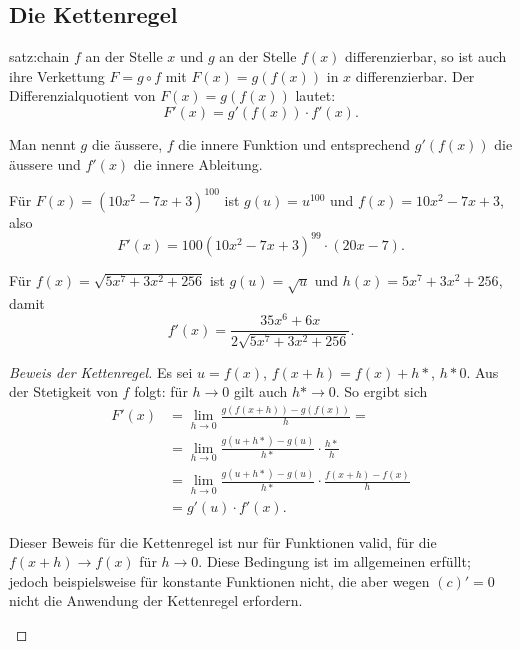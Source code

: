 \documentclass[%
11pt,%
twoside,%
titlepage,%
german,%
headsepline%
]{scrartcl}
\begin{document}
\subsection{Die Kettenregel}
\begin{csatz}{satz:chain}
$f$ an der Stelle $x$ und $g$ an der Stelle $f(x)$ differenzierbar, so ist auch ihre Verkettung $F=g\circ f$ mit $F(x)=g(f(x))$ in $x$ differenzierbar. Der Differenzialquotient von $F(x)=g(f(x))$ lautet:
$$F'(x)=g'(f(x))\cdot f'(x).$$
\end{csatz}
\begin{bem}
Man nennt $g$ die \"aussere, $f$ die innere Funktion und entsprechend $g'(f(x))$ die \"aussere und $f'(x)$ die innere Ableitung.
\end{bem}
\begin{bsps}
F\"ur $F(x)=(10x^2-7x+3)^{100}$ ist $g(u)=u^{100}$ und $f(x)=10x^2-7x+3$, also $$F'(x)=100(10x^2-7x+3)^{99}\cdot(20x-7).$$

F\"ur $f(x)=\sqrt{5x^7+3x^2+256}$ ist $g(u)=\sqrt{u}$ und $h(x)=5x^7+3x^2+256$, damit $$f'(x)=\frac{35x^6+6x}{2\sqrt{5x^7+3x^2+256}}.$$
\end{bsps}

\begin{proof}[Beweis der Kettenregel]
Es sei $u=f(x)$, $f(x+h)=f(x)+h*$, $h*­0$. Aus der Stetigkeit von $f$ folgt: f\"ur $h\to0$ gilt auch $h*\to0$. So ergibt sich
\begin{align*}
F'(x)&=\lim_{h\to0}\frac{g(f(x+h))-g(f(x))}{h}=\\
&=\lim_{h\to0}\frac{g(u+h*)-g(u)}{h*}\cdot\frac{h*}{h}\\
&=\lim_{h\to0}\frac{g(u+h*)-g(u)}{h*}\cdot\frac{f(x+h)-f(x)}{h}\\
&=g'(u)\cdot f'(x).
\end{align*}
\begin{bem}
Dieser Beweis f\"ur die Kettenregel ist nur f\"ur Funktionen valid, f\"ur die $f(x+h)\to f(x)$ für $h\to 0$. Diese Bedingung ist im allgemeinen erf\"ullt; jedoch beispielsweise f\"ur konstante Funktionen nicht, die aber wegen $(c)'=0$ nicht die Anwendung der Kettenregel erfordern.
\end{bem}
\end{proof}
\end{document}
